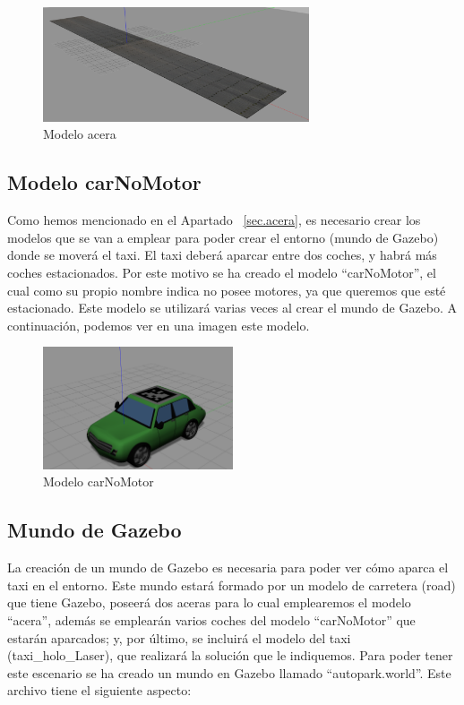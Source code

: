 \begin{figure}[H]
  \begin{center}
    \includegraphics[width=0.7\textwidth]{figures/Autopark/acera.png}
		\caption{Modelo acera}
		\label{fig.acera}
		\end{center}
\end{figure}

\subsection{Modelo carNoMotor}
Como hemos mencionado en el Apartado ~\ref{sec.acera}, es necesario crear los modelos que se van a emplear para poder crear el entorno (mundo de Gazebo) donde se moverá el taxi. El taxi deberá aparcar entre dos coches, y habrá más coches estacionados. Por este motivo se ha creado el modelo ``carNoMotor'', el cual como su propio nombre indica no posee motores, ya que queremos que esté estacionado. Este modelo se utilizará varias veces al crear el mundo de Gazebo. A continuación, podemos ver en una imagen este modelo.

\begin{figure}[H]
  \begin{center}
    \includegraphics[width=0.5\textwidth]{figures/Autopark/carNoMotor.png}
		\caption{Modelo carNoMotor}
		\label{fig.carNoMotor}
		\end{center}
\end{figure}

\subsection{Mundo de Gazebo}
La creación de un mundo de Gazebo es necesaria para poder ver cómo aparca el taxi en el entorno. Este mundo estará formado por un modelo de carretera (road) que tiene Gazebo, poseerá dos aceras para lo cual emplearemos el modelo ``acera'', además se emplearán varios coches del modelo ``carNoMotor'' que estarán aparcados; y, por último, se incluirá el modelo del taxi (taxi\_holo\_Laser), que realizará la solución que le indiquemos. Para poder tener este escenario se ha creado un mundo en Gazebo llamado ``autopark.world''. Este archivo tiene el siguiente aspecto:

